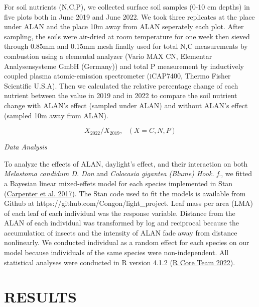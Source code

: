 \documentclass[
  letterpaper,
  DIV=11,
  numbers=noendperiod]{scrartcl}
\begin{document}
For soil nutrients (N,C,P), we collected surface soil samples (0-10 cm
depths) in five plots both in June 2019 and June 2022. We took three
replicates at the place under ALAN and the place 10m away from ALAN
seperately each plot. After sampling, the soils were air-dried at room
temperature for one week then sieved through 0.85mm and 0.15mm mesh
finally used for total N,C measurements by combustion using a elemental
analyzer (Vario MAX CN, Elementar Analysensysteme GmbH (Germany)) and
total P measurement by inductively coupled plasma atomic-emission
spectrometer (iCAP7400, Thermo Fisher Scientific U.S.A). Then we
calculated the relative percentage change of each nutrient between the
value in 2019 and in 2022 to compare the soil nutrient change with
ALAN's effect (sampled under ALAN) and without ALAN's effect (sampled
10m away from ALAN).

\[
X_{2022}/X_{2019}, \ \ \ (X = C,N,P)
\]

\emph{Data Analysis}

To analyze the effects of ALAN, daylight's effect, and their interaction
on both \emph{Melastoma candidum D. Don} and \emph{Colocasia gigantea
(Blume) Hook. f.}, we fitted a Bayesian linear mixed-effets model for
each species implemented in Stan
(\protect\hyperlink{ref-Carpenter2017}{Carpenter et al. 2017}). The Stan
code used to fit the models is available from Github at
https://github.com/Congon/light\_project. Leaf mass per area (LMA) of
each leaf of each individual was the response variable. Distance from
the ALAN of each individual was transformed by log and reciprocal
because the accumulation of insects and the intensity of ALAN fade away
from distance nonlinearly. We conducted individual as a random effect
for each species on our model because individuals of the same species
were non-independent. All statistical analyses were conducted in R
version 4.1.2 (\protect\hyperlink{ref-RCoreTeam2022}{R Core Team 2022}).

\hypertarget{results}{%
\section{RESULTS}\label{results}}
\end{document}
